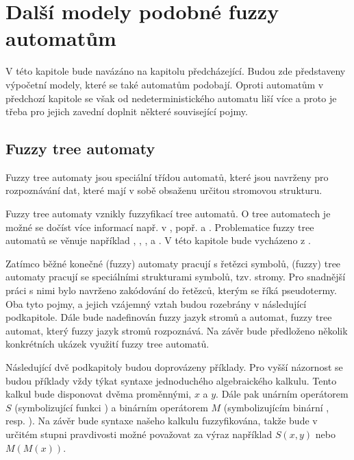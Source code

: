 \documentclass[a4paper,10pt]{article}
\begin{document}
\section{Další modely podobné fuzzy automatům}
V této kapitole bude navázáno na kapitolu předcházející. Budou zde představeny výpočetní modely, které se také automatům podobají. Oproti automatům v předchozí kapitole se však od  nedeterministického automatu liší více a proto je třeba pro jejich zavední doplnit některé související pojmy. 


\subsection{Fuzzy tree automaty}
Fuzzy tree automaty jsou speciální třídou automatů, které jsou navrženy pro rozpoznávání dat, které mají v sobě obsaženu určitou stromovou strukturu.

Fuzzy tree automaty vznikly fuzzyfikací  tree automatů. O  tree automatech je možné se dočíst více informací např. v \cite{Com+-TreeAutTecApp}, popř. \cite{Hua-SyntPattRecSeisOilExp} a \cite{Bez+-FuzModAlgPatRecImProc}. Problematice fuzzy tree automatů se věnuje například \cite{Lee-FuzTreAutSynPatRec}, \cite{MogZadAme-NewDirInFuzzTreeAut}, \cite{ChaJos-NoteFuzzTreeAut}, \cite{EsiLiu-FuzzTreeAut} a \cite{MorMal-FuzzyAutLang}. V této kapitole bude vycházeno z \cite{MorMal-FuzzyAutLang}.

Zatímco běžné konečné (fuzzy) automaty pracují s řetězci symbolů, (fuzzy) tree automaty pracují se speciálními strukturami symbolů, tzv. stromy. Pro snadnější práci s nimi bylo navrženo zakódování do řetězců, kterým se říká pseudotermy. Oba tyto pojmy, a jejich vzájemný vztah budou rozebrány v následující podkapitole. Dále bude nadefinován fuzzy jazyk stromů a automat, fuzzy tree automat, který fuzzy jazyk stromů rozpoznává. Na závěr bude předloženo několik konkrétních ukázek využití fuzzy tree automatů.

Následující dvě podkapitoly budou doprovázeny příklady. Pro vyšší názornost se budou příklady vždy týkat syntaxe jednoduchého algebraického kalkulu. Tento kalkul bude disponovat dvěma proměnnými, $x$ a $y$. Dále pak unárním operátorem $S$ (symbolizující funkci ) a binárním operátorem $M$ (symbolizujícím binární , resp. ). Na závěr bude syntaxe našeho kalkulu fuzzyfikována, takže bude v určitém stupni pravdivosti možné považovat za výraz například $S(x, y)$ nebo $M(M(x))$.
\end{document}
